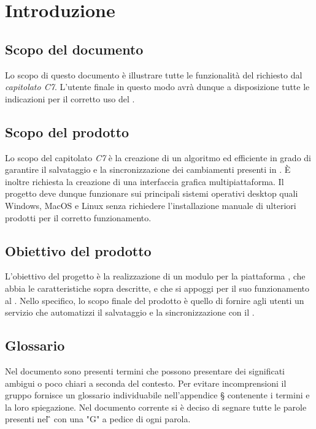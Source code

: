 \section{Introduzione}
\subsection{Scopo del documento}
Lo scopo di questo documento è illustrare tutte le funzionalità del  richiesto dal \textit{capitolato C7}. L'utente finale in questo modo avrà dunque a disposizione tutte le indicazioni per il corretto uso del .

\subsection{Scopo del prodotto}
Lo scopo del capitolato \textit{C7} è la creazione di un algoritmo  ed efficiente in grado di garantire il salvataggio e la sincronizzazione dei cambiamenti presenti in . È inoltre richiesta la creazione di una interfaccia grafica multipiattaforma. Il progetto deve dunque funzionare sui principali sistemi operativi desktop quali Windows, MacOS e Linux senza richiedere l'installazione manuale di ulteriori prodotti per il corretto funzionamento. 
\subsection{Obiettivo del prodotto}
L'obiettivo del progetto è la realizzazione di un modulo per la piattaforma , che abbia le caratteristiche sopra descritte, e che si appoggi per il suo funzionamento al  .
Nello specifico, lo scopo finale del prodotto è quello di fornire agli utenti un servizio che automatizzi il salvataggio e la sincronizzazione con il .
\subsection{Glossario}
Nel documento sono presenti termini che possono presentare dei significati ambigui o poco chiari a seconda del contesto.
Per evitare incomprensioni il gruppo fornisce un glossario individuabile nell'appendice \S{} contenente i termini e la loro spiegazione.\newline{}
Nel documento corrente si è deciso di segnare tutte le parole presenti nel \G{} con una "G" a pedice di ogni parola.